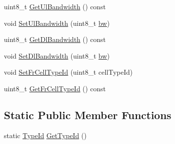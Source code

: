 \begin{DoxyCompactItemize}
uint8\+\_\+t \hyperlink{classns3_1_1LteFfrAlgorithm_a5516492150e36c4fb932ec4e14b7a358}{Get\+Ul\+Bandwidth} () const 
\item 
void \hyperlink{classns3_1_1LteFfrAlgorithm_a78f942e4289387cf8f40e19d50b6bc7c}{Set\+Ul\+Bandwidth} (uint8\+\_\+t \hyperlink{lte__ue__measurements_8m_a3f7228a3941f19f282647a09dd494528}{bw})
\item 
uint8\+\_\+t \hyperlink{classns3_1_1LteFfrAlgorithm_a6a773f523d655410367910b556a8d888}{Get\+Dl\+Bandwidth} () const 
\item 
void \hyperlink{classns3_1_1LteFfrAlgorithm_a7c88c6bd3d94ac2f4093614ba73b4bba}{Set\+Dl\+Bandwidth} (uint8\+\_\+t \hyperlink{lte__ue__measurements_8m_a3f7228a3941f19f282647a09dd494528}{bw})
\item 
void \hyperlink{classns3_1_1LteFfrAlgorithm_a2777368c2efaa8342c23875d2e6ff5c0}{Set\+Fr\+Cell\+Type\+Id} (uint8\+\_\+t cell\+Type\+Id)
\item 
uint8\+\_\+t \hyperlink{classns3_1_1LteFfrAlgorithm_a1e8b7572910fb250506e5949929ff6fd}{Get\+Fr\+Cell\+Type\+Id} () const 
\end{DoxyCompactItemize}
\subsection*{Static Public Member Functions}
\begin{DoxyCompactItemize}
\item 
static \hyperlink{classns3_1_1TypeId}{Type\+Id} \hyperlink{classns3_1_1LteFfrAlgorithm_a10648d4cc814a88bf707052bc7f2a4ca}{Get\+Type\+Id} ()
\end{DoxyCompactItemize}
